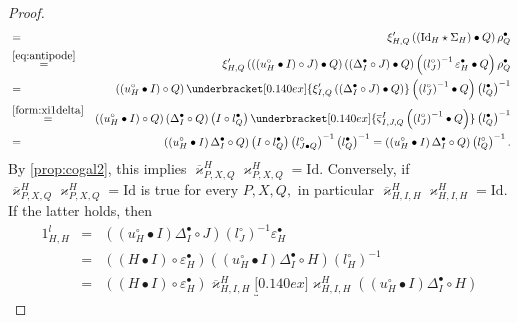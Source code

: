 \documentclass[nosumlimits,twoside]{amsart}
\theoremstyle{definition}
\theoremstyle{remark}
\begin{document}
\begin{proof}
\begin{eqnarray*}
&=&\xi _{H,Q}^{\prime }\left( \left( \mathrm{Id}_{H}\star \Sigma _{H}\right)
\bullet Q\right) \rho _{Q}^{\bullet } \\
&\overset{\eqref{eq:antipode}}=&\xi _{H,Q}^{\prime }\left( \left( \left( u_{H}^{\circ }\bullet I\right)
\circ J\right) \bullet Q\right) \left( \left( \Delta _{I}^{\bullet }\circ
J\right) \bullet Q\right) \left( \left( l_{J}^{\circ }\right)
^{-1}\varepsilon _{H}^{\bullet }\bullet Q\right) \rho _{Q}^{\bullet } \\
&=&\left( \left( u_{H}^{\circ }\bullet I\right) \circ Q\right) %
\underbracket[0.140ex]{\xi _{I,Q}^{\prime }\left( \left( \Delta
_{I}^{\bullet }\circ J\right) \bullet Q\right) }\left( \left( l_{J}^{\circ
}\right) ^{-1}\bullet Q\right) \left( l_{Q}^{\bullet }\right) ^{-1} \\
&\overset{\eqref{form:xi1delta}}{=}&\left( \left( u_{H}^{\circ }\bullet
I\right) \circ Q\right) \left( \Delta _{I}^{\bullet }\circ Q\right) \left(
I\circ l_{Q}^{\bullet }\right) \underbracket[0.140ex]{\overline{\varsigma
}_{I,J,Q}^{I}\left( \left( l_{J}^{\circ }\right) ^{-1}\bullet Q\right) }%
\left( l_{Q}^{\bullet }\right) ^{-1} \\
&=&\left( \left( u_{H}^{\circ }\bullet I\right) \Delta _{I}^{\bullet }\circ
Q\right) \left( I\circ l_{Q}^{\bullet }\right) \left( l_{J\bullet Q}^{\circ
}\right) ^{-1}\left( l_{Q}^{\bullet }\right) ^{-1} 
=\left( \left( u_{H}^{\circ }\bullet I\right) \Delta _{I}^{\bullet }\circ
Q\right) \left( l_{Q}^{\circ }\right) ^{-1}.
\end{eqnarray*}%
By \cref{prop:cogal2}, this implies $\overline{\varkappa }_{P,X,Q}^{H}%
\varkappa _{P,X,Q}^{H}=\mathrm{Id.}$ Conversely, if $\overline{\varkappa }%
_{P,X,Q}^{H}\varkappa _{P,X,Q}^{H}=\mathrm{Id}$ is true for every $P,X,Q,$
in particular $\overline{\varkappa }_{H,I,H}^{H}\varkappa _{H,I,H}^{H}=%
\mathrm{Id.}$ If the latter holds, then%
\begin{eqnarray*}
1_{H,H}^{l} &=&\left( \left( u_{H}^{\circ }\bullet I\right) \Delta
_{I}^{\bullet }\circ J\right) \left( l_{J}^{\circ }\right) ^{-1}\varepsilon
_{H}^{\bullet } \\
&=&\left( \left( H\bullet I\right) \circ \varepsilon _{H}^{\bullet }\right)
\left( \left( u_{H}^{\circ }\bullet I\right) \Delta _{I}^{\bullet }\circ
H\right) \left( l_{H}^{\circ }\right) ^{-1} \\
&=&\left( \left( H\bullet I\right) \circ \varepsilon _{H}^{\bullet }\right)
\overline{\varkappa }_{H,I,H}^{H}\underbracket[0.140ex]{\varkappa _{H,I,H}^{H}\left(
\left( u_{H}^{\circ }\bullet I\right) \Delta _{I}^{\bullet }\circ H\right)
}
\end{eqnarray*}
\end{proof}
\end{document}
